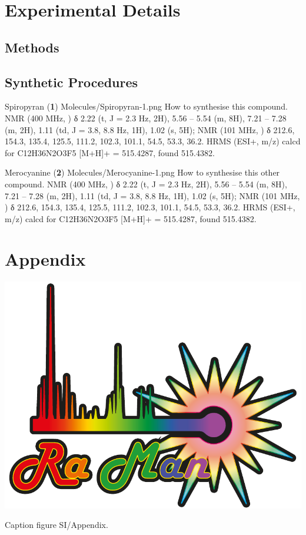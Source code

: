\documentclass[main_brownies.tex]{subfiles}
\begin{document}

\section*{Experimental Details}
\subsection*{Methods}
\Blindtext[2][1]

\subsection*{Synthetic Procedures}
\synth
{Spiropyran (\textbf{1})}
{Molecules/Spiropyran-1.png}
{How to synthesise this compound. \blindtext[1]}
{ NMR (400 MHz, ) δ 2.22 (t, J = 2.3 Hz, 2H), 5.56 – 5.54 (m, 8H), 7.21 – 7.28 (m, 2H), 1.11 (td, J = 3.8, 8.8 Hz, 1H), 1.02 (s, 5H);  NMR (101 MHz, ) δ 212.6, 154.3, 135.4, 125.5, 111.2, 102.3, 101.1, 54.5, 53.3, 36.2.}
{HRMS (ESI+, m/z) calcd for C12H36N2O3F5 [M+H]+ = 515.4287, found 515.4382.}

\synth
{Merocyanine (\textbf{2})}
{Molecules/Merocyanine-1.png}
{How to synthesise this other compound. \blindtext[1]}
{ NMR (400 MHz, ) δ 2.22 (t, J = 2.3 Hz, 2H), 5.56 – 5.54 (m, 8H), 7.21 – 7.28 (m, 2H), 1.11 (td, J = 3.8, 8.8 Hz, 1H), 1.02 (s, 5H);  NMR (101 MHz, ) δ 212.6, 154.3, 135.4, 125.5, 111.2, 102.3, 101.1, 54.5, 53.3, 36.2.}
{HRMS (ESI+, m/z) calcd for C12H36N2O3F5 [M+H]+ = 515.4287, found 515.4382.}

\clearpage
\newpage

\section*{Appendix}
\vspace*{-\baselineskip} %

\begin{figureSI}[H] %
	\centering
	\includegraphics[width=.65\textwidth]{Figure_S1/Chapter_2_Figure_S1} %
	\caption{Caption figure SI/Appendix.}
	\label{fgr:Figure_S1}
\end{figureSI}
\end{document}
